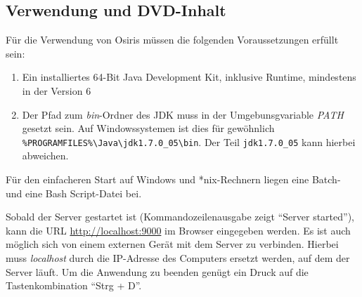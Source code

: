 \begin{appendix}
\chapter{Verwendung und DVD-Inhalt}
Für die Verwendung von Osiris müssen die folgenden Voraussetzungen erfüllt sein:
\begin{enumerate}
    \item Ein installiertes 64-Bit Java Development Kit, inklusive Runtime, mindestens in der Version 6
    \item Der Pfad zum \textit{bin}-Ordner des JDK muss in der Umgebunsgvariable \textit{PATH} gesetzt sein. Auf Windowssystemen ist dies für gewöhnlich \texttt{\%PROGRAMFILES\%\-\textbackslash Java\-\textbackslash jdk1.7.0\_05\-\textbackslash bin}. Der Teil \texttt{jdk1.7.0\_05} kann hierbei abweichen.
\end{enumerate}
Für den einfacheren Start auf Windows und *nix-Rechnern liegen eine Batch- und eine Bash Script-Datei bei.

Sobald der Server gestartet ist (Kommandozeilenausgabe zeigt "`Server started"'), kann die URL \url{http://localhost:9000} im Browser eingegeben werden. Es ist auch möglich sich von einem externen Gerät mit dem Server zu verbinden. Hierbei muss \textit{localhost} durch die IP-Adresse des Computers ersetzt werden, auf dem der Server läuft. Um die Anwendung zu beenden genügt ein Druck auf die Tastenkombination "`Strg + D"'.


\end{appendix}

